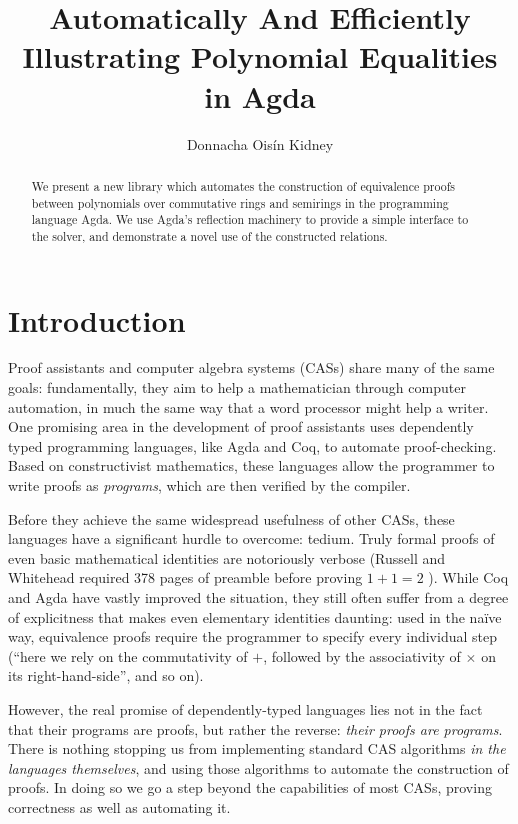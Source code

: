 \documentclass[draft, twocolumn]{article}
\author{Donnacha Oisín Kidney}
\title{Automatically And Efficiently Illustrating Polynomial Equalities in Agda}
\theoremstyle{definition}
\theoremstyle{definition}
\begin{document}
\maketitle
\begin{abstract}
  We present a new library which automates the construction of equivalence
  proofs between polynomials over commutative rings and semirings in the
  programming language Agda\cite{norell_dependently_2008}. We use Agda's
  reflection machinery to provide a simple interface to the solver, and
  demonstrate a novel use of the constructed relations.
\end{abstract}
\tableofcontents
\section{Introduction}
Proof assistants and computer algebra systems (CASs) share many of the same
goals: fundamentally, they aim to help a mathematician through computer
automation, in much the same way that a word processor might help a writer. One
promising area in the development of proof assistants uses dependently typed
programming languages, like Agda\cite{norell_dependently_2008} and
Coq\cite{the_coq_development_team_2018_1219885}, to automate proof-checking.
Based on constructivist mathematics, these languages allow the programmer to
write proofs as \emph{programs}, which are then verified by the compiler.

Before they achieve the same widespread usefulness of other CASs, these
languages have a significant hurdle to overcome: tedium. Truly formal proofs of
even basic mathematical identities are notoriously verbose (Russell and
Whitehead required 378 pages of preamble before proving \(1+1=2\)
\cite{whitehead_principia_1910}). While Coq and Agda have vastly improved the
situation, they still often suffer from a degree of explicitness that makes even
elementary identities daunting: used in the naïve way, equivalence proofs
require the programmer to specify every individual step (``here we rely on the
commutativity of \(+\), followed by the associativity of \(\times\) on its
right-hand-side'', and so on).

However, the real promise of dependently-typed languages lies not in the fact
that their programs are proofs, but rather the reverse: \emph{their proofs are
  programs}. There is nothing stopping us from implementing standard CAS
algorithms \emph{in the languages themselves}, and using those algorithms to
automate the construction of proofs. In doing so we go a step beyond the
capabilities of most CASs, proving correctness as well as automating it.
\end{document}
